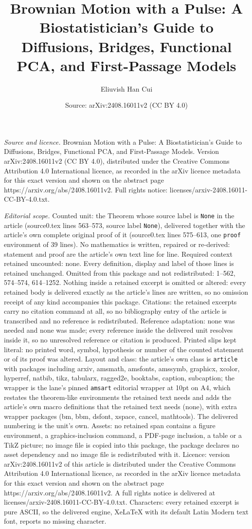 \documentclass[10pt,a4paper]{amsart}
\title[Brownian Motion with a Pulse: A Biostatistician's Guide to D]{Brownian Motion with a Pulse: A Biostatistician's Guide to Diffusions, Bridges, Functional PCA, and First-Passage Models}
\author{Eliuvish Han Cui}
\date{Source: arXiv:2408.16011v2 (CC BY 4.0)}
\begin{document}
\maketitle

\noindent\emph{Source and licence.} Brownian Motion with a Pulse: A Biostatistician's Guide to Diffusions, Bridges, Functional PCA, and First-Passage Models. Version arXiv:2408.16011v2 (CC BY 4.0), distributed under the Creative Commons Attribution 4.0 International licence, as recorded in the arXiv licence metadata for this exact version and shown on the abstract page https://arxiv.org/abs/2408.16011v2. Full rights notice: licenses/arxiv-2408.16011-CC-BY-4.0.txt.\par\smallskip

\noindent\textit{Editorial scope.} Counted unit: the Theorem whose source label is \texttt{None} in the article (source0.tex lines 563--573, source label \texttt{None}), delivered together with the article's own complete original proof of it (source0.tex lines 575--613, one \texttt{proof} environment of 39 lines). No mathematics is written, repaired or re-derived: statement and proof are the article's own text line for line. Required context retained uncounted: none. Every definition, display and label of those lines is retained unchanged. Omitted from this package and not redistributed: 1--562, 574--574, 614--1252. Nothing inside a retained excerpt is omitted or altered: every retained body is delivered exactly as the article's lines are written, so no omission receipt of any kind accompanies this package. Citations: the retained excerpts carry no citation command at all, so no bibliography entry of the article is transcribed and no reference is redistributed. Reference adaptation: none was needed and none was made; every reference inside the delivered unit resolves inside it, so no unresolved reference or citation is produced. Printed slips kept literal: no printed word, symbol, hypothesis or number of the counted statement or of its proof was altered. Layout and class: the article's own class is \texttt{article} with packages including arxiv, amsmath, amsfonts, amssymb, graphicx, xcolor, hyperref, natbib, tikz, tabularx, ragged2e, booktabs, caption, subcaption; the wrapper is the lane's pinned \texttt{amsart} editorial wrapper at 10pt on A4, which restates the theorem-like environments the retained text needs and adds the article's own macro definitions that the retained text needs (none), with extra wrapper packages (bm, bbm, dsfont, xspace, cancel, mathtools). The delivered numbering is the unit's own. Assets: no retained span contains a figure environment, a graphics-inclusion command, a PDF-page inclusion, a table or a TikZ picture; no image file is copied into this package, the package declares no asset dependency and no image file is redistributed with it. Licence: version arXiv:2408.16011v2 of this article is distributed under the Creative Commons Attribution 4.0 International licence, as recorded in the arXiv licence metadata for this exact version and shown on the abstract page https://arxiv.org/abs/2408.16011v2. A full rights notice is delivered at licenses/arxiv-2408.16011-CC-BY-4.0.txt. Characters: every retained excerpt is pure ASCII, so the delivered engine, XeLaTeX with its default Latin Modern text font, reports no missing character.
\end{document}
